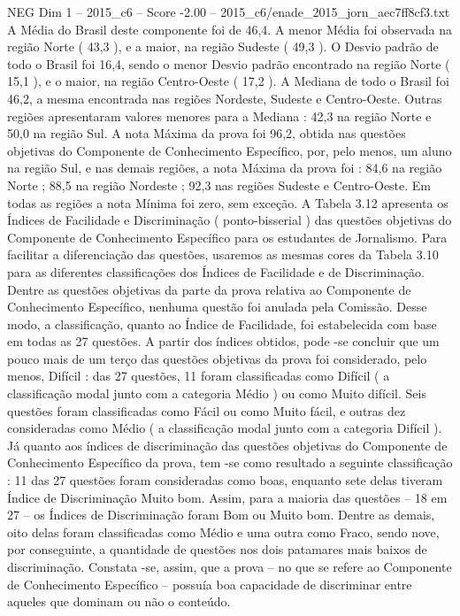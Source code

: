\begin{textsample}{NEG Dim 1 – 2015\_c6 – Score -2.00 – 2015\_c6/enade\_2015\_jorn\_aec7ff8cf3.txt}
A Média do Brasil deste componente foi de 46,4.
A menor Média foi observada na região Norte ( 43,3 ), e a maior, na região Sudeste ( 49,3 ).
O Desvio padrão de todo o Brasil foi 16,4, sendo o menor Desvio padrão encontrado na região Norte ( 15,1 ), e o maior, na região Centro-Oeste ( 17,2 ).
A Mediana de todo o Brasil foi 46,2, a mesma encontrada nas regiões Nordeste, Sudeste e Centro-Oeste.
Outras regiões apresentaram valores menores para a Mediana : 42,3 na região Norte e 50,0 na região Sul.
A nota Máxima da prova foi 96,2, obtida nas questões objetivas do Componente de Conhecimento Específico, por, pelo menos, um aluno na região Sul, e nas demais regiões, a nota Máxima da prova foi : 84,6 na região Norte ; 88,5 na região Nordeste ; 92,3 nas regiões Sudeste e Centro-Oeste.
Em todas as regiões a nota Mínima foi zero, sem exceção.
A Tabela 3.12 apresenta os Índices de Facilidade e Discriminação ( ponto-bisserial ) das questões objetivas do Componente de Conhecimento Específico para os estudantes de Jornalismo.
Para facilitar a diferenciação das questões, usaremos as mesmas cores da Tabela 3.10 para as diferentes classificações dos Índices de Facilidade e de Discriminação.
Dentre as questões objetivas da parte da prova relativa ao Componente de Conhecimento Específico, nenhuma questão foi anulada pela Comissão.
Desse modo, a classificação, quanto ao Índice de Facilidade, foi estabelecida com base em todas as 27 questões.
A partir dos índices obtidos, pode -se concluir que um pouco mais de um terço das questões objetivas da prova foi considerado, pelo menos, Difícil : das 27 questões, 11 foram classificadas como Difícil ( a classificação modal junto com a categoria Médio ) ou como Muito difícil.
Seis questões foram classificadas como Fácil ou como Muito fácil, e outras dez consideradas como Médio ( a classificação modal junto com a categoria Difícil ).
Já quanto aos índices de discriminação das questões objetivas do Componente de Conhecimento Específico da prova, tem -se como resultado a seguinte classificação : 11 das 27 questões foram consideradas como boas, enquanto sete delas tiveram Índice de Discriminação Muito bom.
Assim, para a maioria das questões – 18 em 27 – os Índices de Discriminação foram Bom ou Muito bom.
Dentre as demais, oito delas foram classificadas como Médio e uma outra como Fraco, sendo nove, por conseguinte, a quantidade de questões nos dois patamares mais baixos de discriminação.
Constata -se, assim, que a prova – no que se refere ao Componente de Conhecimento Específico – possuía boa capacidade de discriminar entre aqueles que dominam ou não o conteúdo.

\end{textsample}
